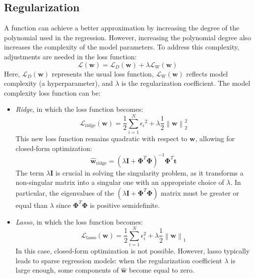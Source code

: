 \subsection{Regularization}
A function can achieve a better approximation by increasing the degree of the polynomial used in the regression.
However, increasing the polynomial degree also increases the complexity of the model parameters.
To address this complexity, adjustments are needed in the loss function:
\[\mathcal{L}(\mathbf{w})=\mathcal{L}_D(\mathbf{w})+\lambda \mathcal{L}_W(\mathbf{w})\]
Here, $\mathcal{L}_D(\mathbf{w})$ represents the usual loss function, $\mathcal{L}_W(\mathbf{w})$ reflects model complexity (a hyperparameter), and $\lambda$ is the regularization coefficient.
The model complexity loss function can be: 
\begin{itemize}
    \item \textit{Ridge}, in which the loss function becomes: 
        \[\mathcal{L}_{\text{ridge}}(\mathbf{w})=\dfrac{1}{2}\sum_{i=1}^N {\epsilon_i}^2 + \lambda\dfrac{1}{2}{\left\lVert \mathbf{w} \right\rVert}_2^2\]
        This new loss function remains quadratic with respect to $\mathbf{w}$, allowing for closed-form optimization:
        \[\hat{\mathbf{w}}_{\text{ridge}}={\left( \lambda\mathbf{I}+\boldsymbol{\Phi}^T \boldsymbol{\Phi} \right)}^{-1}\boldsymbol{\Phi}^T\mathbf{t}\]
        The term $\lambda\mathbf{I}$ is crucial in solving the singularity problem, as it transforms a non-singular matrix into a singular one with an appropriate choice of $\lambda$.
        In particular, the eigenvalues of the $\left( \lambda\mathbf{I}+\boldsymbol{\Phi}^T \boldsymbol{\Phi} \right)$ matrix must be greater or equal than $\lambda$ since $\boldsymbol{\Phi}^T \boldsymbol{\Phi}$ is positive semidefinite. 
    \item \textit{Lasso}, in which the loss function becomes: 
        \[\mathcal{L}_{\text{lasso}}(\mathbf{w})=\dfrac{1}{2}\sum_{i=1}^N \epsilon_i^2 + \lambda\dfrac{1}{2}{\left\lVert \mathbf{w} \right\rVert}_1\]
        In this case, closed-form optimization is not possible. 
        However, lasso typically leads to sparse regression models: when the regularization coefficient $\lambda$ is large enough, some components of $\hat{\mathbf{w}}$ become equal to zero.
\end{itemize}

